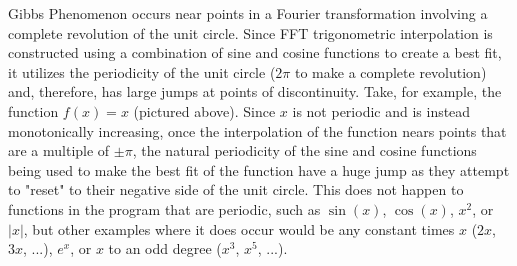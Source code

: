 \documentclass[12pt]{article}
\begin{document}
Gibbs Phenomenon occurs near points in a Fourier transformation involving a complete revolution of the unit circle. Since FFT trigonometric interpolation is constructed using a combination of sine and cosine functions to create a best fit, it utilizes the periodicity of the unit circle ($2\pi$ to make a complete revolution) and, therefore, has large jumps at points of discontinuity. Take, for example, the function $f(x) = x$ (pictured above). Since $x$ is not periodic and is instead monotonically increasing, once the interpolation of the function nears points that are a multiple of $\pm \pi$, the natural periodicity of the sine and cosine functions being used to make the best fit of the function have a huge jump as they attempt to "reset" to their negative side of the unit circle. This does not happen to functions in the program that are periodic, such as $\sin(x)$, $\cos(x)$, $x^2$, or $|x|$, but other examples where it does occur would be any constant times $x$ ($2x$, $3x$, ...), $e^x$, or $x$ to an odd degree ($x^3$, $x^5$, ...).
\end{document}

